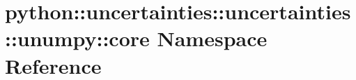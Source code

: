\hypertarget{namespacepython_1_1uncertainties_1_1uncertainties_1_1unumpy_1_1core}{
\section{python::uncertainties::uncertainties::unumpy::core Namespace Reference}
\label{namespacepython_1_1uncertainties_1_1uncertainties_1_1unumpy_1_1core}
}
